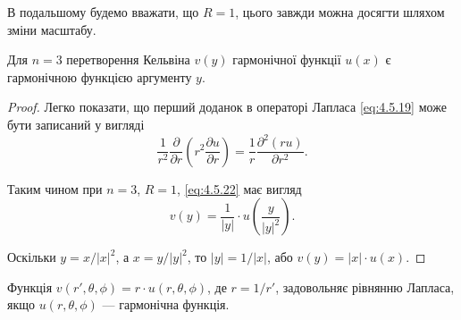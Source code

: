 \begin{remark}
	В подальшому будемо вважати, що $R = 1$, цього завжди можна досягти шляхом зміни масштабу. 
\end{remark}

\begin{proposition}
	Для $n = 3$ перетворення Кельвіна $v(y)$ гармонічної функції $u(x)$ є гармонічною функцією аргументу $y$. 
\end{proposition}

\begin{proof}
	Легко показати, що перший доданок в операторі Лапласа \eqref{eq:4.5.19} може бути записаний у вигляді 
	\begin{equation}
		\frac{1}{r^2} \frac{\partial}{\partial r} \left( r^2 \frac{\partial u}{\partial r} \right) = \frac{1}{r} \frac{\partial^2 (ru)}{\partial r^2}.
	\end{equation}
	
	Таким чином при $n = 3$, $R = 1$, \eqref{eq:4.5.22} має вигляд
	\begin{equation}
		v(y) = \frac{1}{|y|} \cdot u \left( \frac{y}{|y|^2} \right).
	\end{equation}
	
	Оскільки $y = x / |x|^2$, а $x = y / |y|^2$, то $|y| = 1 / |x|$, або $v(y) = |x| \cdot u(x)$.
\end{proof}

\begin{proposition}
	Функція $v(r', \theta, \phi) = r \cdot u(r, \theta, \phi)$, де $r = 1 / r'$, задовольняє рівнянню Лапласа, якщо $u(r, \theta, \phi)$ --- гармонічна функція.
\end{proposition}


